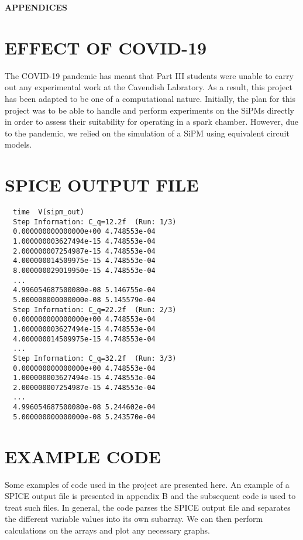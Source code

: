 
\onecolumn
\LARGE
\noindent\textbf{APPENDICES}
\normalsize
\appendix

\section{EFFECT OF COVID-19}

The COVID-19 pandemic has meant that Part III students were unable to carry out any experimental work at the Cavendish Labratory. As a result, this project has been adapted to be one of a computational nature. Initially, the plan for this project was to be able to handle and perform experiments on the SiPMs directly in order to assess their suitability for operating in a spark chamber. However, due to the pandemic, we relied on the simulation of a SiPM using equivalent circuit models.

\section{SPICE OUTPUT FILE}

\begin{verbatim}
  time	V(sipm_out)
  Step Information: C_q=12.2f  (Run: 1/3)
  0.000000000000000e+00	4.748553e-04
  1.000000003627494e-15	4.748553e-04
  2.000000007254987e-15	4.748553e-04
  4.000000014509975e-15	4.748553e-04
  8.000000029019950e-15	4.748553e-04
  ...
  4.996054687500080e-08	5.146755e-04
  5.000000000000000e-08	5.145579e-04
  Step Information: C_q=22.2f  (Run: 2/3)
  0.000000000000000e+00	4.748553e-04
  1.000000003627494e-15	4.748553e-04
  4.000000014509975e-15	4.748553e-04
  ...
  Step Information: C_q=32.2f  (Run: 3/3)
  0.000000000000000e+00	4.748553e-04
  1.000000003627494e-15	4.748553e-04
  2.000000007254987e-15	4.748553e-04
  ...
  4.996054687500080e-08	5.244602e-04
  5.000000000000000e-08	5.243570e-04
\end{verbatim}

\section{EXAMPLE CODE}

Some examples of code used in the project are presented here. An example of a SPICE output file is presented in appendix B and the subsequent code is used to treat such files. In general, the code parses the SPICE output file and separates the different variable values into its own subarray. We can then perform calculations on the arrays and plot any necessary graphs.

